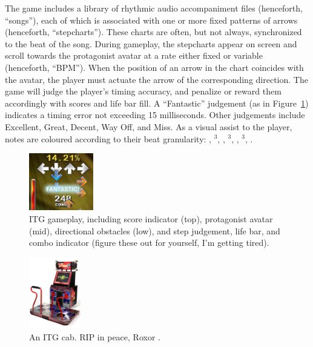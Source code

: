 \documentclass[10pt]{sigplanconf}
\begin{document}
The game includes a library of rhythmic audio accompaniment files (henceforth, ``songs''), each of which is associated with one or more fixed patterns of arrows (henceforth, ``stepcharts''). These charts are often, but not always, synchronized to the beat of the song.
During gameplay, the stepcharts appear on screen and scroll towards the protagonist avatar at a rate either fixed or variable (henceforth, ``BPM'').
When the position of an arrow in the chart coincides with the avatar, the player must actuate the arrow of the corresponding direction.
The game will judge the player's timing accuracy, and penalize or reward them accordingly with scores and life bar fill.
A ``Fantastic'' judgement (as in Figure~\ref{fig:protagonist}) indicates a timing error not exceeding 15 milliseconds.
Other judgements include Excellent, Great, Decent, Way Off, and Miss.
As a visual assist to the player, notes are coloured according to their beat granularity:
\color{red}\Vier\color{black},
\color{Purple}\Vier$^3$\color{black},
\color{blue}\Acht\color{black},
\color{Purple}\Acht$^3$\color{black},
\color{LimeGreen}\Sech\color{black},
\color{Magenta}\Sech$^3$\color{black},
\color{Dandelion}\Zwdr\color{black}.


\begin{figure}[t]
	\begin{center}
	\includegraphics[width=0.25\textwidth]{protagonist.png}
	\end{center}
	\caption{ITG gameplay, including score indicator (top), protagonist avatar (mid), directional obstacles (low), and step judgement, life bar, and combo indicator (figure these out for yourself, I'm getting tired).}
	\label{fig:protagonist}
\end{figure}
\begin{figure}[t]
	\begin{center}
	\includegraphics[width=0.2\textwidth]{itg2cabinet.jpg}
	\end{center}
	\caption{An ITG cab. RIP in peace, Roxor \cite{konami}.}
	\label{fig:cab}
\end{figure}
\end{document}
